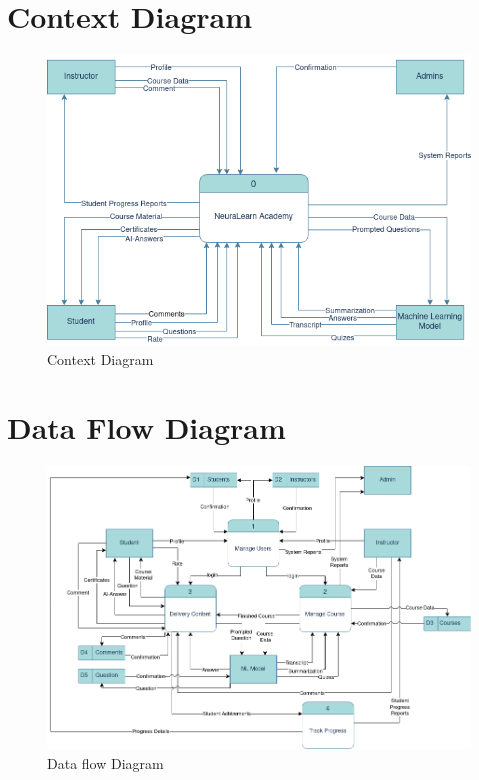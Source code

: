 \newpage

\section{Context Diagram}
\begin{figure}[h!]
	\centering
	\includegraphics[max height=\textheight,max width=\textwidth]{figures/Context-Diagram.png}
	\caption{Context Diagram}
\end{figure}

\newpage


\section{Data Flow Diagram}
\begin{figure}[h!]
	\centering
	\includegraphics[max height=\textheight,max width=\textwidth]{figures/DFD.png}
	\caption{Data flow Diagram}
\end{figure}

